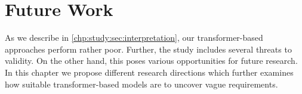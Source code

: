 \chapter{Future Work}
\label{chp:future_work}
As we describe in \cref{chp:study:sec:interpretation}, our transformer-based approaches perform rather poor.
Further, the study includes several threats to validity.
On the other hand, this poses various opportunities for future research.
In this chapter we propose different research directions which further examines how suitable transformer-based models are to uncover vague requirements.





